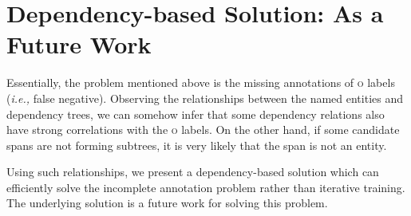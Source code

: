 


\section{Dependency-based Solution: As a Future Work}

Essentially, the problem mentioned above is the missing annotations of \textsc{o} labels (\textit{i.e.,} false negative). 
Observing the relationships between the named entities and dependency trees, we can somehow infer that some dependency relations also have strong correlations with the \textsc{o} labels.
On the other hand, if some candidate spans are not forming subtrees, it is very likely that the span is not an entity.

Using such relationships, we present a dependency-based solution which can efficiently solve the incomplete annotation problem rather than iterative training. 
The underlying solution is a future work for solving this problem.


